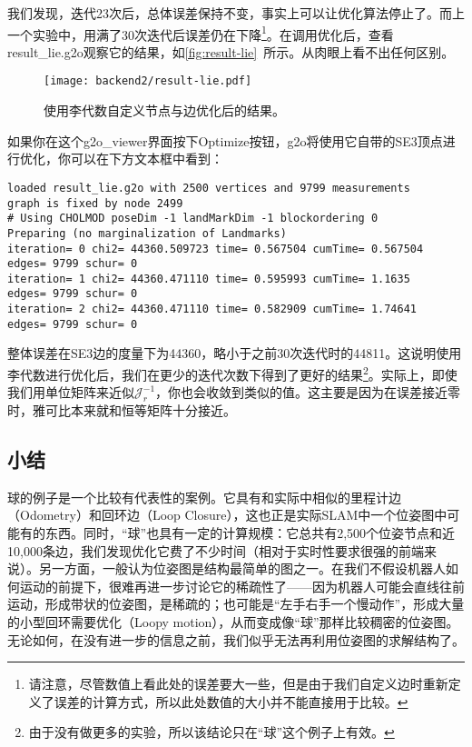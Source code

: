 我们发现，迭代23次后，总体误差保持不变，事实上可以让优化算法停止了。而上一个实验中，用满了30次迭代后误差仍在下降\footnote{请注意，尽管数值上看此处的误差要大一些，但是由于我们自定义边时重新定义了误差的计算方式，所以此处数值的大小并不能直接用于比较。}。在调用优化后，查看result\_lie.g2o观察它的结果，如\autoref{fig:result-lie}~所示。从肉眼上看不出任何区别。

\begin{figure}[!ht]
	\centering
	\texttt{[image: backend2/result-lie.pdf]}
	\caption{使用李代数自定义节点与边优化后的结果。}
	\label{fig:result-lie}
\end{figure}

如果你在这个g2o\_viewer界面按下Optimize按钮，g2o将使用它自带的SE3顶点进行优化，你可以在下方文本框中看到：

\begin{lstlisting}
loaded result_lie.g2o with 2500 vertices and 9799 measurements
graph is fixed by node 2499
# Using CHOLMOD poseDim -1 landMarkDim -1 blockordering 0
Preparing (no marginalization of Landmarks)
iteration= 0 chi2= 44360.509723 time= 0.567504 cumTime= 0.567504 edges= 9799 schur= 0
iteration= 1 chi2= 44360.471110 time= 0.595993 cumTime= 1.1635   edges= 9799 schur= 0
iteration= 2 chi2= 44360.471110 time= 0.582909 cumTime= 1.74641  edges= 9799 schur= 0
\end{lstlisting}

整体误差在SE3边的度量下为44360，略小于之前30次迭代时的44811。这说明使用李代数进行优化后，我们在更少的迭代次数下得到了更好的结果\footnote{由于没有做更多的实验，所以该结论只在“球”这个例子上有效。}。实际上，即使我们用单位矩阵来近似$\bm{\mathcal{J}}_r^{-1}$，你也会收敛到类似的值。这主要是因为在误差接近零时，雅可比本来就和恒等矩阵十分接近。

\subsection{小结}
球的例子是一个比较有代表性的案例。它具有和实际中相似的里程计边（Odometry）和回环边（Loop Closure），这也正是实际SLAM中一个位姿图中可能有的东西。同时，“球”也具有一定的计算规模：它总共有2,500个位姿节点和近10,000条边，我们发现优化它费了不少时间（相对于实时性要求很强的前端来说）。另一方面，一般认为位姿图是结构最简单的图之一。在我们不假设机器人如何运动的前提下，很难再进一步讨论它的稀疏性了——因为机器人可能会直线往前运动，形成带状的位姿图，是稀疏的；也可能是“左手右手一个慢动作”，形成大量的小型回环需要优化（Loopy motion），从而变成像“球”那样比较稠密的位姿图。无论如何，在没有进一步的信息之前，我们似乎无法再利用位姿图的求解结构了。

